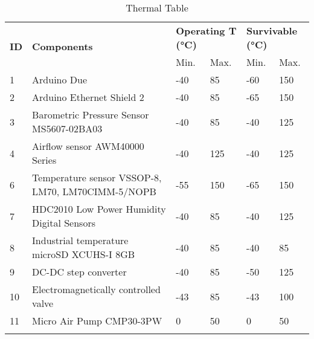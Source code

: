 
\begin{longtable}{|m{1cm}|m{3.5cm}|m{1cm}|m{1cm}|m{1cm}|m{1cm}|}
\hline
\multirow{2}{*}{\textbf{ID}} & \multirow{2}{*}{\textbf{Components}}                                 & \multicolumn{2}{l|}{\textbf{Operating T (°C)}} & \multicolumn{2}{l|}{\textbf{Survivable (°C)}} \\ \cline{3-6} 
                             &                                                                      & Min.                   & Max.                  & Min.                  & Max.                  \\ \hline
1                            & Arduino Due                                                          & -40                    & 85                    & -60                   & 150                   \\ \hline
2                            & Arduino Ethernet Shield 2                                            & -40                    & 85                    & -65                   & 150                   \\ \hline
3                            & Barometric Pressure Sensor MS5607-02BA03                             & -40                    & 85                    & -40                   & 125                   \\ \hline
4                            & Airflow sensor AWM40000 Series                                       & -40                    & 125                   & -40                   & 125                   \\ \hline
6                            & Temperature sensor VSSOP-8, LM70, LM70CIMM-5/NOPB & -55                    & 150                   & -65                   & 150                   \\ \hline
7                            & HDC2010 Low Power Humidity Digital Sensors                           & -40                    & 85                    & -40                   & 125                   \\ \hline
8                            & Industrial temperature microSD XCUHS-I 8GB                           & -40                    & 85                    & -40                   & 85                    \\ \hline
9                            & DC-DC step converter                                                 & -40                       & 85                       & -50                      & 125                      \\ \hline
10                           & Electromagnetically controlled valve                                 &  -43                      & 85              & -43                      & 100                      \\ \hline
11                           & Micro Air Pump CMP30-3PW                                                             & 0                       & 50                      & 0                      & 50                      \\ \hline

\caption{Thermal Table}
\label{tab:thermal-table}
\end{longtable}
\raggedbottom